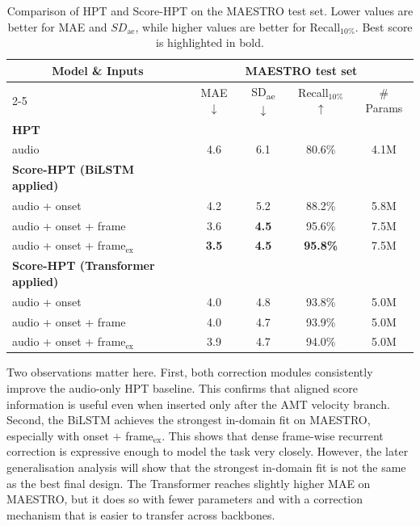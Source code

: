 \begin{table}[!htbp]
    \centering
    \caption{Comparison of HPT and Score-HPT on the MAESTRO test set. Lower values are better for MAE and \(SD_{\mathrm{ae}}\), while higher values are better for Recall$_{10\%}$. Best score is highlighted in bold.}
    \label{tab:scoreinf_maestro}
    \setlength{\tabcolsep}{10pt}
    \fontsize{11pt}{13pt}\selectfont
    \renewcommand{\arraystretch}{1.2}
    \begin{tabular}{l|cccc}
    \toprule
    \multicolumn{1}{c|}{\multirow{2}{*}{\textbf{Model \& Inputs}}}
      & \multicolumn{4}{c}{\textbf{MAESTRO test set}} \\
    \cmidrule(l){2-5}
      & MAE $\downarrow$ & SD\textsubscript{ae} $\downarrow$ & Recall$_{10\%}$ $\uparrow$ & \# Params \\
    \midrule
    \textbf{HPT} & & & & \\
    audio & 4.6 & 6.1 & 80.6\% & 4.1M \\
    \midrule
    \textbf{Score-HPT (BiLSTM applied)} & & & & \\
    audio + onset & 4.2 & 5.2 & 88.2\% & 5.8M \\
    audio + onset + frame & 3.6 & \textbf{4.5} & 95.6\% & 7.5M \\
    audio + onset + frame$_{\text{ex}}$ & \textbf{3.5} & \textbf{4.5} & \textbf{95.8\%} & 7.5M \\
    \midrule
    \textbf{Score-HPT (Transformer applied)} & & & & \\
    audio + onset & 4.0 & 4.8 & 93.8\% & 5.0M \\
    audio + onset + frame & 4.0 & 4.7 & 93.9\% & 5.0M \\
    audio + onset + frame$_{\text{ex}}$ & 3.9 & 4.7 & 94.0\% & 5.0M \\
    \bottomrule
    \end{tabular}
\end{table}

Two observations matter here. First, both correction modules consistently improve the audio-only HPT baseline. This confirms that aligned score information is useful even when inserted only after the AMT velocity branch. Second, the BiLSTM achieves the strongest in-domain fit on MAESTRO, especially with onset $+$ frame$_{\text{ex}}$. This shows that dense frame-wise recurrent correction is expressive enough to model the task very closely. However, the later generalisation analysis will show that the strongest in-domain fit is not the same as the best final design. The Transformer reaches slightly higher MAE on MAESTRO, but it does so with fewer parameters and with a correction mechanism that is easier to transfer across backbones.

